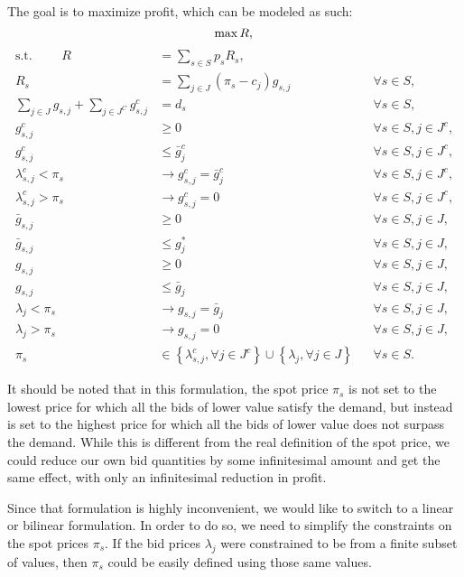 \documentclass[12pt]{article}
\begin{document}
The goal is to maximize profit, which can be modeled as such:
\begin{equation}
\max R, \\
\end{equation}
\begin{align}
\mbox{s.t. } \qquad R &= \sum_{s \in S} p_s R_s, \\
R_s &= \sum_{j \in J} \left(\pi_s - c_j\right) g_{s,j} & &\forall s \in S, \\
\sum_{j \in J} g_{s,j} + \sum_{j \in J^C} g^c_{s,j} &= d_s & &\forall s \in S, \\
g^c_{s,j} &\ge 0 & &\forall s \in S, j \in J^c, \\
g^c_{s,j} &\le \bar{g}^{c}_j & &\forall s \in S, j \in J^c, \\
\lambda^c_{s,j} < \pi_s &\rightarrow g^c_{s,j} = \bar{g}^{c}_j & &\forall s \in S, j \in J^c, \\
\lambda^c_{s,j} > \pi_s &\rightarrow g^c_{s,j} = 0 & &\forall s \in S, j \in J^c, \\
\bar{g}_{s,j} &\ge 0 & &\forall s \in S, j \in J, \\
\bar{g}_{s,j} &\le g^*_j & &\forall s \in S, j \in J, \\
g_{s,j} &\ge 0 & &\forall s \in S, j \in J, \\
g_{s,j} &\le \bar{g}_j & &\forall s \in S, j \in J, \\
\lambda_{j} < \pi_s &\rightarrow g_{s,j} = \bar{g}_j & &\forall s \in S, j \in J, \\
\lambda_{j} > \pi_s &\rightarrow g_{s,j} = 0 & &\forall s \in S, j \in J, \\
\pi_s &\in \left\{ \lambda^c_{s,j}, \forall j \in J^c \right\} \cup \left\{ \lambda_j, \forall j \in J \right\} & &\forall s \in S.
\end{align}


It should be noted that in this formulation, the spot price $\pi_s$ is not
set to the lowest price for which all the bids of lower value satisfy the
demand, but instead is set to the highest price for which all the bids of
lower value does not surpass the demand. While this is different from the
real definition of the spot price, we could reduce our own bid quantities
by some infinitesimal amount and get the same effect, with only an
infinitesimal reduction in profit.

Since that formulation is highly inconvenient, we would like to switch to
a linear or bilinear formulation. In order to do so, we need to simplify
the constraints on the spot prices $\pi_s$. If the bid prices $\lambda_j$ were
constrained to be from a finite subset of values, then $\pi_s$ could be
easily defined using those same values.
\end{document}
